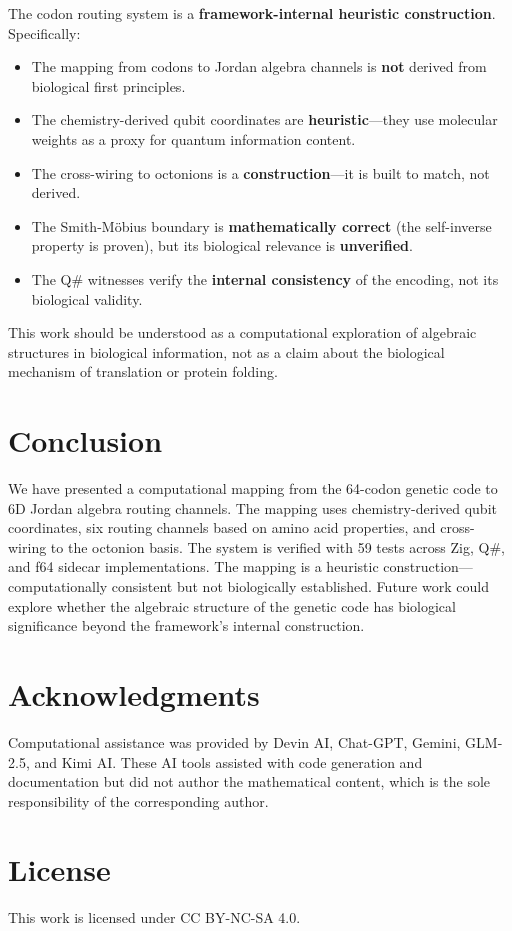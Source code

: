 \documentclass[11pt]{article}
\begin{document}
The codon routing system is a \textbf{framework-internal heuristic construction}. Specifically:

\begin{itemize}
\item The mapping from codons to Jordan algebra channels is \textbf{not} derived from biological first principles.
\item The chemistry-derived qubit coordinates are \textbf{heuristic}---they use molecular weights as a proxy for quantum information content.
\item The cross-wiring to octonions is a \textbf{construction}---it is built to match, not derived.
\item The Smith-M\"obius boundary is \textbf{mathematically correct} (the self-inverse property is proven), but its biological relevance is \textbf{unverified}.
\item The Q\# witnesses verify the \textbf{internal consistency} of the encoding, not its biological validity.
\end{itemize}

This work should be understood as a computational exploration of algebraic structures in biological information, not as a claim about the biological mechanism of translation or protein folding.

\section{Conclusion}

We have presented a computational mapping from the 64-codon genetic code to 6D Jordan algebra routing channels. The mapping uses chemistry-derived qubit coordinates, six routing channels based on amino acid properties, and cross-wiring to the octonion basis. The system is verified with 59 tests across Zig, Q\#, and f64 sidecar implementations. The mapping is a heuristic construction---computationally consistent but not biologically established. Future work could explore whether the algebraic structure of the genetic code has biological significance beyond the framework's internal construction.

\section*{Acknowledgments}

Computational assistance was provided by Devin AI, Chat-GPT, Gemini, GLM-2.5, and Kimi AI. These AI tools assisted with code generation and documentation but did not author the mathematical content, which is the sole responsibility of the corresponding author.

\section*{License}

This work is licensed under CC BY-NC-SA 4.0.



\end{document}
